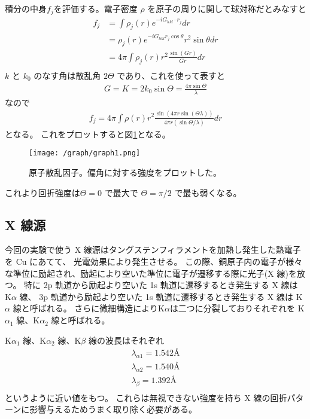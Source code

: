 \documentclass[11pt,dvipdfmx,a4paper]{jsarticle}
\begin{document}
積分の中身\(f_j\)を評価する。電子密度 \(\rho\) を原子の周りに関して球対称だとみなすと
\begin{align}
	f_j &=\int \rho_j(r) e^{-iG_{hkl}\cdot r_j}dr\\
	&= \rho_j(r) e^{-iG_{hkl} r_j \cos\theta}r^2\sin\theta dr\\
	&= 4\pi \int \rho_j(r) r^2 \frac{\sin(Gr)}{Gr}dr\\
\end{align}
\(k\) と \(k_0\) のなす角は散乱角 \(2\Theta\) であり、これを使って表すと
\begin{align}
	G = K = 2k_0\sin\Theta = \frac{4\pi\sin\Theta}{\lambda}
\end{align}
なので
\begin{align}
	f_j  = 4\pi \int \rho(r) r^2 \frac{\sin(4\pi r\sin(\Theta \lambda))}{4\pi r(\sin\Theta/\lambda)} dr
\end{align}
となる。
これをプロットすると図\ref{graph1}となる。
\begin{figure}[H]
	\centering
	\texttt{[image: /graph/graph1.png]}
	\caption{原子散乱因子。偏角に対する強度をプロットした。}
	\label{graph1}
\end{figure}
これより回折強度は\(\Theta = 0\) で最大で \(\Theta = \pi/2\) で最も弱くなる。

\subsection{X 線源}
今回の実験で使う X 線源はタングステンフィラメントを加熱し発生した熱電子を Cu にあてて、
光電効果により発生させる。
この際、銅原子内の電子が様々な準位に励起され、励起により空いた準位に電子が遷移する際に光子(X 線)を放つ。
特に
2p 軌道から励起より空いた 1s 軌道に遷移するとき発生する X 線は K\(\alpha\) 線、
3p 軌道から励起より空いた 1s 軌道に遷移するとき発生する X 線は K\(\alpha\) 線と呼ばれる。
さらに微細構造によりK\(\alpha\)は二つに分裂しておりそれぞれを
K\(\alpha_1\) 線、K\(\alpha_2\) 線と呼ばれる。

K\(\alpha_1\) 線、K\(\alpha_2\) 線、K\(\beta\) 線の波長はそれぞれ
\begin{align}
	\lambda_{\alpha1} = 1.542 \text{\AA}\\
	\lambda_{\alpha2} = 1.540 \text{\AA}\\
	\lambda_{\beta} = 1.392 \text{\AA}\\
\end{align}
というように近い値をもつ。\cite{rikanenpyo}
これらは無視できない強度を持ち X 線の回折パターンに影響与えるためうまく取り除く必要がある。
\end{document}
